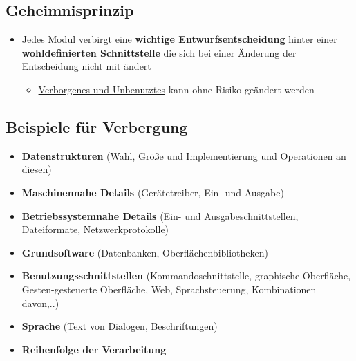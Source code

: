 		\subsection{Geheimnisprinzip}
			
			\begin{itemize}
				\item Jedes Modul verbirgt eine \textbf{wichtige Entwurfsentscheidung} hinter einer \textbf{wohldefinierten Schnittstelle} die sich bei einer Änderung der Entscheidung \underline{nicht} mit ändert
				\begin{itemize}
					\item \underline{Verborgenes und Unbenutztes} kann ohne Risiko geändert werden
				\end{itemize}
			\end{itemize}
				
		\subsection{Beispiele für Verbergung}
				
			\begin{itemize}
				\item \textbf{Datenstrukturen} (Wahl, Größe und Implementierung und Operationen an diesen)
				\item \textbf{Maschinennahe Details} (Gerätetreiber, Ein- und Ausgabe)
				\item \textbf{Betriebssystemnahe Details} (Ein- und Ausgabeschnittstellen, Dateiformate, Netzwerkprotokolle)
				\item \textbf{Grundsoftware} (Datenbanken, Oberflächenbibliotheken)
				\item \textbf{Benutzungsschnittstellen} (Kommandoschnittstelle, graphische Oberfläche, Gesten-gesteuerte Oberfläche, Web, Sprachsteuerung, Kombinationen davon,..)
				\item \textbf{\underline{Sprache}} (Text von Dialogen, Beschriftungen)
				\item \textbf{Reihenfolge der Verarbeitung}
			\end{itemize}